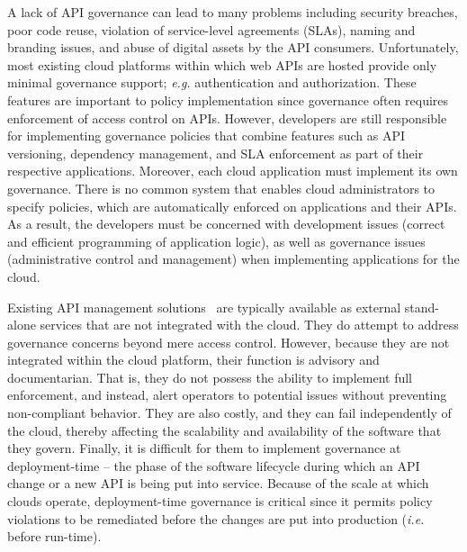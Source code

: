 A lack of API governance can lead to many problems including security breaches, 
poor code reuse, violation of service-level agreements (SLAs), 
naming and branding issues, and abuse of digital 
assets by the API consumers. Unfortunately, most existing cloud platforms
within which web APIs are hosted provide only minimal governance support; 
{\em e.g.} authentication and authorization.  These features
are important to policy implementation since governance often requires
enforcement of access control on APIs.  
However, developers are still responsible for implementing governance policies
that combine features such as API versioning, 
dependency management, and SLA enforcement as part of their respective
applications.  Moreover, each cloud application must
implement its own governance. There is no common system that enables
cloud administrators to specify policies, which are automatically enforced on 
applications and their APIs.
As a result, the developers must be concerned with development issues (correct
and efficient programming of application logic), as well as governance issues 
(administrative control and management) when implementing applications for the cloud.

Existing API management solutions~\cite{3scale,apigee,layer7} are typically available as
external stand-alone services that are not integrated with the cloud. They do attempt to
address governance concerns beyond mere access control. However, because they
are not integrated within the cloud platform, their function is
advisory and documentarian.  That is, they 
do not possess the ability to implement full enforcement, and instead, alert
operators to potential issues without preventing non-compliant behavior.
They are also costly, and they can fail independently of the cloud, thereby affecting 
the scalability and availability of the software that they govern.
Finally, it is difficult for them to
implement governance at deployment-time -- the phase of the software lifecycle
during which an API change or a new API is being put into service.
Because of the scale at which clouds operate, deployment-time governance is
critical since it permits policy violations to be remediated before the
changes are put into production ({\em i.e.} before run-time).


